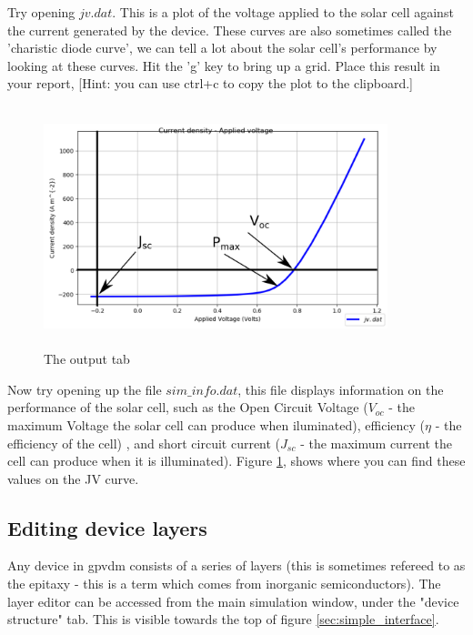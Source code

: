 Try opening $jv.dat$. This is a plot of the voltage applied to the solar cell against the current generated by the device.  These curves are also sometimes called the 'charistic diode curve', we can tell a lot about the solar cell's performance by looking at these curves.  Hit the 'g' key to bring up a grid.  Place this result in your report, [Hint: you can use ctrl+c to copy the plot to the clipboard.]

\begin{figure}[H]
\centering
\includegraphics[width=100mm,height=70mm]{./images/jv_curve.png}
\caption{The output tab}
\label{fig:jv_curve}
\end{figure}


Now try opening up the file $sim\_info.dat$, this file displays information on the performance of the solar cell, such as the Open Circuit Voltage ($V_{oc}$ - the maximum Voltage the solar cell can produce when iluminated), efficiency ($\eta$ - the efficiency of the cell) , and short circuit current ($J_{sc}$ - the maximum current the cell can produce when it is illuminated).  Figure \ref{fig:jv_curve}, shows where you can find these values on the JV curve.

\subsection{Editing device layers}
\label{sec:layereditor}
Any device in gpvdm consists of a series of layers (this is sometimes refereed to as the epitaxy - this is a term which comes from inorganic semiconductors). The layer editor can be accessed from the main simulation window, under the "device structure" tab. This is visible towards the top of figure \ref{sec:simple_interface}.

